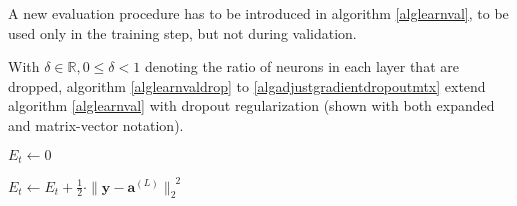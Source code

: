 \documentclass[titlepage]{article}
\begin{document}
          A new evaluation procedure has to be introduced in algorithm
          \ref{alglearnval}, to be used only in the training step, but not during
          validation.

          With $\delta \in \mathbb{R}, 0 \leq \delta < 1$ denoting the ratio of
          neurons in each layer that are dropped, algorithm
          \ref{alglearnvaldrop} to \ref{algadjustgradientdropoutmtx} extend
          algorithm \ref{alglearnval} with dropout regularization (shown with
          both expanded and matrix-vector notation).

          \begin{algorithm}
            \caption{%
              Modified version of algorithm \ref{alglearnval} with droput
              regularization.
            } \label{alglearnvaldrop}
            \begin{algorithmic}
                \State $E_t \gets 0$

                  \State {}
                  \State {}
                  \State $
                    E_t \gets
                      E_t
                      +
                      \frac{1}{2}
                      \cdot
                      \| \mathbf{y} - \mathbf{a}^{(L)} \|_2^{\enspace 2}
                  $
                \EndFor
              \EndProcedure
            \end{algorithmic}
          \end{algorithm}
\end{document}
